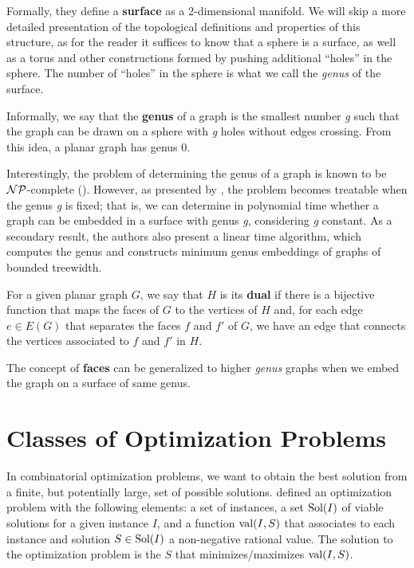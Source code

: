 Formally, they define a \textbf{surface} as a 2-dimensional manifold. We will skip a more detailed presentation of the topological definitions and properties of this structure, as for the reader it suffices to know that a sphere is a surface, as well as a torus and other constructions formed by pushing additional ``holes'' in the sphere. The number of ``holes'' in the sphere is what we call the \textit{genus} of the surface.

Informally, we say that the \textbf{genus} of a graph is the smallest number \textit{g} such that the graph can be drawn on a sphere with \textit{g} holes without edges crossing. From this idea, a planar graph has genus 0.

Interestingly, the problem of determining the genus of a graph is known to be \(\mathcal{NP}\)-complete (\cite{THOMASSEN1989568}). However, as presented by \cite{LinearGenus}, the problem becomes treatable when the genus \textit{g} is fixed; that is, we can determine in polynomial time whether a graph can be embedded in a surface with genus \textit{g}, considering \textit{g} constant. As a secondary result, the authors also present a linear time algorithm, which computes the genus and constructs minimum genus embeddings of graphs of bounded treewidth. 

For a given planar graph \(G\), we say that \(H\) is its \textbf{dual} if there is a bijective function that maps the faces of \(G\) to the vertices of \(H\) and, for each edge \(e \in E(G)\) that separates the faces \(f\) and \(f'\) of \(G\), we have an edge that connects the vertices associated to \(f\) and \(f'\) in \(H\).

The concept of \textbf{faces} can be generalized to higher \textit{genus} graphs when we embed the graph on a surface of same genus.

\section{Classes of Optimization Problems}

In combinatorial optimization problems, we want to obtain the best solution from a finite, but potentially large, set of possible solutions. \cite{livroAprox} defined an optimization problem with the following elements: a set of instances, a set \(\operatorname{\textrm{Sol}}(I)\) of viable solutions for a given instance \(I\), and a function \(\operatorname{\textrm{val}} (I, S)\) that associates to each instance and solution \(S \in \operatorname{\textrm{Sol}}(I)\) a non-negative rational value. The solution to the optimization problem is the \(S\) that minimizes/maximizes \(\operatorname{\textrm{val}}(I, S)\).

